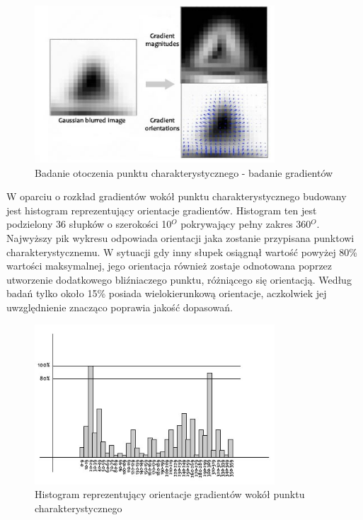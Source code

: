 \begin{figure}[!htb]
\centering
\includegraphics[width=0.8\textwidth]{pict/02/sift/sift_ais_orientation_2.jpg}
\caption{Badanie otoczenia punktu charakterystycznego - badanie gradientów}
\label{fig:sift_ais_orientation_2}
\end{figure}
W oparciu o rozkład gradientów wokół punktu charakterystycznego budowany jest histogram reprezentujący orientacje gradientów. Histogram ten jest podzielony 36 słupków o szerokości 10$^O$  pokrywający pełny zakres 360$^O$. Najwyższy pik wykresu odpowiada orientacji jaka zostanie przypisana punktowi charakterystycznemu. W sytuacji gdy inny słupek osiągnął wartość powyżej 80\% wartości maksymalnej, jego orientacja również zostaje odnotowana poprzez utworzenie dodatkowego bliźniaczego punktu, różniącego się orientacją. Według badań \cite{DGL04} tylko około 15\% posiada wielokierunkową orientacje, aczkolwiek jej uwzględnienie znacząco poprawia jakość dopasowań.
\begin{figure}[!htb]
\centering
\includegraphics[width=0.8\textwidth]{pict/02/sift/sift_ais_orientation_histogram.jpg}
\caption{Histogram reprezentujący orientacje gradientów wokół punktu charakterystycznego}
\label{fig:sift_ais_orientation_histogram}
\end{figure}


